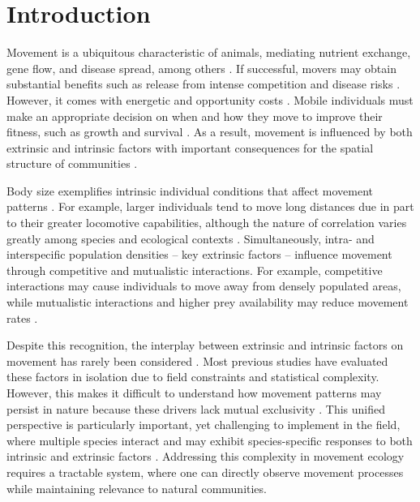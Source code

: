 \documentclass[11pt, class=article, crop=false]{standalone}
\begin{document}
\clearpage
{} 
\newpage

\section{Introduction}

Movement is a ubiquitous characteristic of animals, mediating nutrient exchange, gene flow, and disease spread, among others \citep{cookeMovementEcologyFishes2022, hessDiseaseMetapopulationModels1996, teruiParasiteInfectionInduces2017, fauschLandscapesRiverscapesBridging2002}.
If successful, movers may obtain substantial benefits such as release from intense competition and disease risks \citep{clobertDispersalEcologyEvolution2012, teruiParasiteInfectionInduces2017}.
However, it comes with energetic and opportunity costs \citep{bonteCostsDispersal2012}.
Mobile individuals must make an appropriate decision on when and how they move to improve their fitness, such as growth and survival \citep{bonteCostsDispersal2012}. As a result, movement is influenced by both extrinsic and intrinsic factors with important consequences for the spatial structure of communities \citep{leiboldMetacommunityConceptFramework2004, mcpeekEvolutionPassiveDispersal2024, schlagelMovementmediatedCommunityAssembly2020}. 

Body size exemplifies intrinsic individual conditions that affect movement patterns \citep{clobertDispersalEcologyEvolution2012}. For example, larger individuals tend to move long distances due in part to their greater locomotive capabilities, although the nature of correlation varies greatly among species and ecological contexts \citep{comteEvidenceDispersalSyndromes2018, teruiParasiteInfectionInduces2017, radingerPatternsPredictorsFish2014, debeffeConditiondependentNatalDispersal2012,gilliamMovementCorridorsEnhancement2001, faustinodequeirozEcologicalDriversFish2020}.
Simultaneously, intra- and interspecific population densities -- key extrinsic factors -- influence movement through competitive and mutualistic interactions. For example, competitive interactions may cause individuals to move away from densely populated areas, while mutualistic interactions and higher prey availability may reduce movement rates \citep{thierryInterplayAbioticBiotic2024, rasmussenIndividualMovementStream2017, fronhoferBottomupTopdownControl2018}.

Despite this recognition, the interplay between extrinsic and intrinsic factors on movement has rarely been considered \citep{cookeMovementEcologyFishes2022}. Most previous studies have evaluated these factors in isolation due to field constraints and statistical complexity. However, this makes it difficult to understand how movement patterns may persist in nature because these drivers lack mutual exclusivity \citep{mcmahonLinkingHabitatSelection2006}. 
This unified perspective is particularly important, yet challenging to implement in the field, where multiple species interact and may exhibit species-specific responses to both intrinsic and extrinsic factors \citep{teruiNonrandomDispersalSympatric2021}. Addressing this complexity in movement ecology requires a tractable system, where one can directly observe movement processes while maintaining relevance to natural communities.
\end{document}
